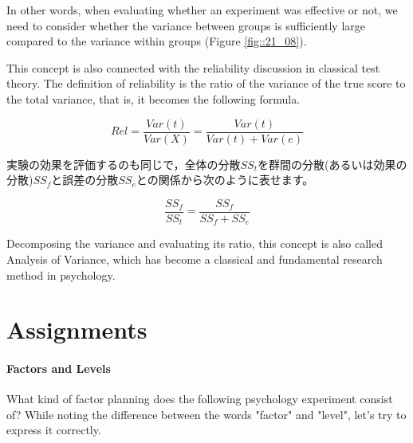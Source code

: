 \documentclass{ltjbook}
\begin{document}
In other words, when evaluating whether an experiment was effective or not, we need to consider whether the variance between groups is sufficiently large compared to the variance within groups (Figure \ref{fig::21_08}).


This concept is also connected with the reliability discussion in classical test theory. The definition of reliability is the ratio of the variance of the true score to the total variance, that is, it becomes the following formula.

\[ Rel = \frac{Var(t)}{Var(X)}=\frac{Var(t)}{Var(t)+Var(e)} \]

実験の効果を評価するのも同じで，全体の分散$SS_t$を群間の分散(あるいは効果の分散)$SS_f$と誤差の分散$SS_e$との関係から次のように表せます。

\[ \frac{SS_f}{SS_t}=\frac{SS_f}{SS_f+SS_e} \]

Decomposing the variance and evaluating its ratio, this concept is also called Analysis of Variance, which has become a classical and fundamental research method in psychology.

\section{Assignments}
\paragraph{Factors and Levels} What kind of factor planning does the following psychology experiment consist of? While noting the difference between the words "factor" and "level", let's try to express it correctly.
\end{document}
